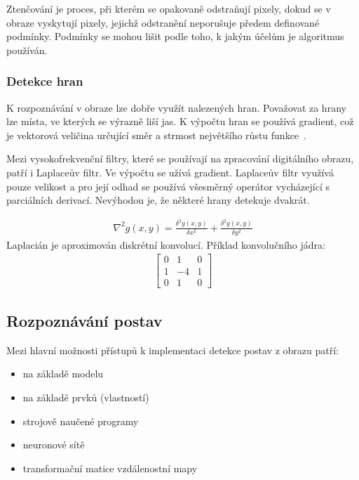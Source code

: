 Ztenčování je proces, při kterém se opakovaně odstraňují pixely, dokud se v obraze vyskytují pixely, jejichž odstranění neporušuje předem definované podmínky. Podmínky se mohou lišit podle toho, k jakým účelům je algoritmus používán.

\subsubsection{Detekce hran}
K rozpoznávání v obraze lze dobře využít nalezených hran. Považovat za hrany lze místa, ve kterých se výrazně liší jas. K výpočtu hran se používá gradient, což je vektorová veličina určující směr a strmost největšího růstu funkce~\cite{hlav}.

Mezi vysokofrekvenční filtry, které se používají na zpracování digitálního obrazu, patří i Laplaceův filtr. Ve výpočtu se užívá gradient. Laplaceův filtr využívá pouze velikost a pro její odhad se používá všesměrný operátor vycházející s parciálních derivací. Nevýhodou je, že některé hrany detekuje dvakrát. %

\begin{eqnarray}
\nabla^{2}g(x,y) = \frac{\delta^{2}g(x,y)}{\delta x^{2}} + \frac{\delta^{2}g(x,y)}{\delta y^{2}}
\end{eqnarray} 
Laplacián je aproximován diskrétní konvolucí. Příklad konvolučního jádra:
\begin{eqnarray}
\begin{bmatrix}
0 & 1 & 0 \\
1 & -4 & 1 \\
0 & 1 & 0
\end{bmatrix}
\end{eqnarray} 


\subsection{Rozpoznávání postav}
Mezi hlavní možnosti přístupů k implementaci detekce postav z obrazu patří:
\begin{itemize}
\item na základě modelu
\item na základě prvků (vlastností)
\item strojově naučené programy
\item neuronové sítě %
\item transformační matice vzdálenostní mapy ~\cite{Cham}\\
\end{itemize}

